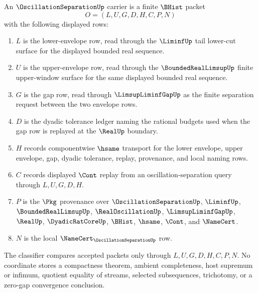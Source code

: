 \begin{definition}
\label{def:oscillation-separation-carrier}
An $\OscillationSeparationUp$ carrier is a finite $\BHist$ packet
$$
O=(L,U,G,D,H,C,P,N)
$$
with the following displayed rows:
\begin{enumerate}
\item $L$ is the lower-envelope row, read through the $\LiminfUp$ tail lower-cut surface for the displayed bounded real sequence.
\item $U$ is the upper-envelope row, read through the $\BoundedRealLimsupUp$ finite upper-window surface for the same displayed bounded real sequence.
\item $G$ is the gap row, read through $\LimsupLiminfGapUp$ as the finite separation request between the two envelope rows.
\item $D$ is the dyadic tolerance ledger naming the rational budgets used when the gap row is replayed at the $\RealUp$ boundary.
\item $H$ records componentwise $\hsame$ transport for the lower envelope, upper envelope, gap, dyadic tolerance, replay, provenance, and local naming rows.
\item $C$ records displayed $\Cont$ replay from an oscillation-separation query through $L,U,G,D,H$.
\item $P$ is the $\Pkg$ provenance over $\OscillationSeparationUp$, $\LiminfUp$, $\BoundedRealLimsupUp$, $\RealOscillationUp$, $\LimsupLiminfGapUp$, $\RealUp$, $\DyadicRatCoreUp$, $\BHist$, $\hsame$, $\Cont$, and $\NameCert$.
\item $N$ is the local $\NameCert_{\OscillationSeparationUp}$ row.
\end{enumerate}
The classifier compares accepted packets only through $L,U,G,D,H,C,P,N$. No coordinate stores a compactness theorem, ambient completeness, host supremum or infimum, quotient equality of streams, selected subsequences, trichotomy, or a zero-gap convergence conclusion.
\end{definition}

